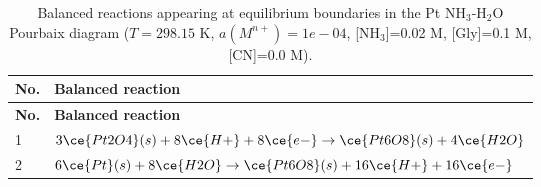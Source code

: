 \begin{longtable}{|p{0.9cm}|p{13.3cm}|}
\caption{Balanced reactions appearing at equilibrium boundaries in the Pt NH$_3$-H$_2$O Pourbaix diagram ($T=298.15$ K, $a(M^{n+})=1e-04$, [NH$_3$]=0.02 M, [Gly]=0.1 M, [CN]=0.0 M).}\\
\hline
\textbf{No.} & \textbf{Balanced reaction} \\ \hline
\endfirsthead
\hline
\textbf{No.} & \textbf{Balanced reaction} \\ \hline
\endhead
1 & $3 \ce{Pt2O4}(s) + 8 \ce{H+} + 8 \ce{e-} \rightarrow \ce{Pt6O8}(s) + 4 \ce{H2O}$ \\ \hline
2 & $6 \ce{Pt}(s) + 8 \ce{H2O} \rightarrow \ce{Pt6O8}(s) + 16 \ce{H+} + 16 \ce{e-}$ \\ \hline
\end{longtable}
